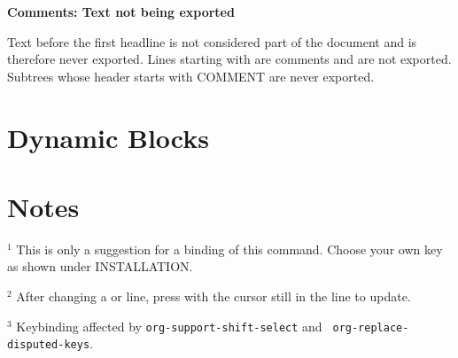 

%
%


{\bf Comments: Text not being exported}

Text before the first headline is not considered part of the document
and is therefore never exported.
Lines starting with \kbd{\#} are comments and are not exported.
Subtrees whose header starts with COMMENT are never exported.


\section{Dynamic Blocks}


\section{Notes}
$^1$ This is only a suggestion for a binding of this command.  Choose
your own key as shown under INSTALLATION.

$^2$ After changing a  or  line,
press  with the cursor still in the line to update.

$^3$ Keybinding affected by {\tt org-support-shift-select} and {\tt
  org-replace-disputed-keys}.

\copyrightnotice

\bye


